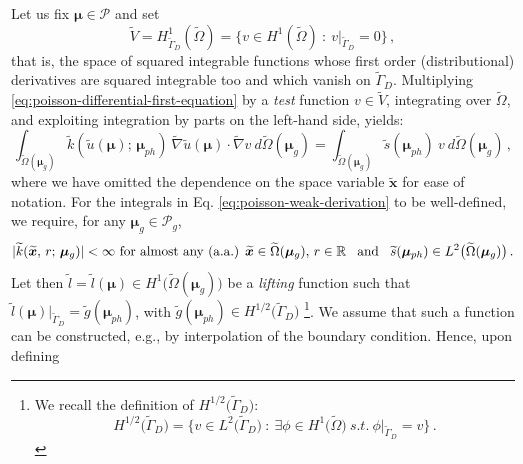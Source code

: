 \documentclass[12pt, a4paper, twoside, openright, notitlepage]{report}
\numberwithin{equation}{chapter}
\theoremstyle{theorem}
\theoremstyle{definition}
\theoremstyle{remark}
\theoremstyle{proposition}
\numberwithin{figure}{chapter}
\newcommand{\wt}[1]{\widetilde{#1}}
\newcommand{\bg}[1]{\boldsymbol{#1}}
\begin{document}
		Let us fix $\bg{\mu} \in \mathcal{P}$ and set 
		\begin{equation*}
			\wt{V} = H^1_{\wt{\Gamma}_D}(\wt{\Omega}) = \big\lbrace v \in H^1(\wt{\Omega}) ~ : ~ v \big\rvert_{\wt{\Gamma}_D} = 0 \big\rbrace \, ,
		\end{equation*}
		that is, the space of squared integrable functions whose first order (distributional) derivatives are squared integrable too and which vanish on $\wt{\Gamma}_D$. Multiplying \eqref{eq:poisson-differential-first-equation} by a \emph{test} function $v \in \wt{V}$, integrating over $\wt{\Omega}$, and exploiting integration by parts on the left-hand side, yields:
		\begin{equation}
			\label{eq:poisson-weak-derivation}
			\int_{\wt{\Omega}(\bg{\mu}_g)} \wt{k}(\wt{u}(\bg{\mu}); \, \bg{\mu}_{ph}) ~ \wt{\nabla} \wt{u}(\bg{\mu}) \cdot \wt{\nabla} v ~ d\wt{\Omega}(\bg{\mu}_g) = \int_{\wt{\Omega}(\bg{\mu}_g)} \wt{s}(\bg{\mu}_{ph}) ~ v ~ d\wt{\Omega}(\bg{\mu}_g) \, ,
		\end{equation}
		where we have omitted the dependence on the space variable $\wt{\bg{x}}$ for ease of notation. For the integrals in Eq. \eqref{eq:poisson-weak-derivation} to be well-defined, we require, for any $\bg{\mu}_g \in \mathcal{P}_g$, 
		\begin{equation*}
			\text{$|\wt{k}(\wt{\bg{x}}, \, r; \, \bg{\mu}_g)| < \infty$ for almost any (a.a.) $\wt{\bg{x}} \in \wt{\Omega}(\bg{\mu}_g), \, r \in \mathbb{R}$}  \hspace*{0.3cm} \text{and} \hspace*{0.3cm} \wt{s}(\bg{\mu}_{ph}) \in L^2 \big( \wt{\Omega}(\bg{\mu}_g) \big) \, .
		\end{equation*}
		Let then $\wt{l} = \wt{l}(\bg{\mu}) \in H^1 \big( \wt{\Omega}(\bg{\mu}_g) \big)$ be a \emph{lifting} function such that $\wt{l}(\bg{\mu}) \big\rvert_{\wt{\Gamma}_D} = \wt{g}(\bg{\mu}_{ph})$, with $\wt{g}(\bg{\mu}_{ph}) \in H^{1/2} \big( \wt{\Gamma}_D \big)$ \footnote{We recall the definition of $H^{1/2} \big( \wt{\Gamma}_D \big)$: \begin{equation*} H^{1/2} \big( \wt{\Gamma}_D \big) = \big\lbrace v \in L^2 \big( \wt{\Gamma}_D \big) ~ : ~ \exists \phi \in H^1 \big(\wt{\Omega} \big) ~ s.t. ~ \phi \big\rvert_{\wt{\Gamma}_D} = v \big\rbrace \, . \end{equation*}}. We assume that such a function can be constructed, e.g., by interpolation of the boundary condition. Hence, upon defining
\end{document}
